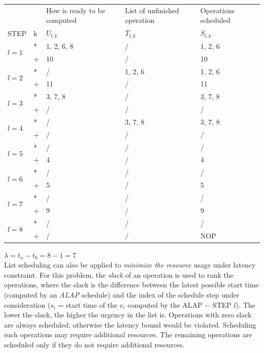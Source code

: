 \begin{center}
\begin{tabular}{l|l|l|l|l}
  \multicolumn{1}{l}{} & \multicolumn{1}{l}{} & \multicolumn{1}{l}{How is ready to be computed} & \multicolumn{1}{l}{List of unfinished operation} & \multicolumn{1}{l}{Operations scheduled} \\
  STEP & k & $ U_{l,k} $ & $ T_{l,k} $ & $ S_{l,k} $ \\
  \hline
  \multirow{2}{*}{$ l=1 $} 
  & * & 1, 2, 6, 8 & / & 1, 2, 6 \\
  & + & 10 & / & 10 \\
  \hline
  \multirow{2}{*}{$ l=2 $} 
  & * & / & 1, 2, 6 & 1, 2, 6 \\
  & + & 11 & / & 11 \\
  \hline
  \multirow{2}{*}{$ l=3 $} 
  & * & 3, 7, 8 & / & 3, 7, 8 \\
  & + & / & / & / \\
  \hline
  \multirow{2}{*}{$ l=4 $} 
  & * & / & 3, 7, 8 & 3, 7, 8 \\
  & + & / & / & / \\
  \hline
  \multirow{2}{*}{$ l=5 $} 
  & * & / & / & / \\
  & + & 4 & / & 4 \\
  \hline
  \multirow{2}{*}{$ l=6 $} 
  & * & / & / & / \\
  & + & 5 & / & 5 \\
  \hline
  \multirow{2}{*}{$ l=7 $} 
  & * & / & / & / \\
  & + & 9 & / & 9 \\
  \hline
  \multirow{2}{*}{$ l=8 $} 
  & * & / & / & / \\
  & + & / & / & NOP \\
\end{tabular}
\end{center}
$\lambda = t_{n} - t_{0}= 8-1 = 7$
\bigskip \\
List scheduling can also be applied to \textit{minimize the resource} usage under latency constraint.  For this problem, the \textit{slack}  of an operation is used to rank the operations, where the slack is the difference between the latest possible start time (computed by an \textit{ALAP} schedule) and the index of the schedule step under consideration ($ s_i $ = start time of the $ v_i $ computed by the ALAP $ - $ STEP $ l $). The lower the slack, the higher the urgency in the list is. Operations with zero slack are always scheduled; otherwise the latency bound would be violated. Scheduling such operations may require additional resources. The remaining operations are scheduled only if they do not require additional resources.
